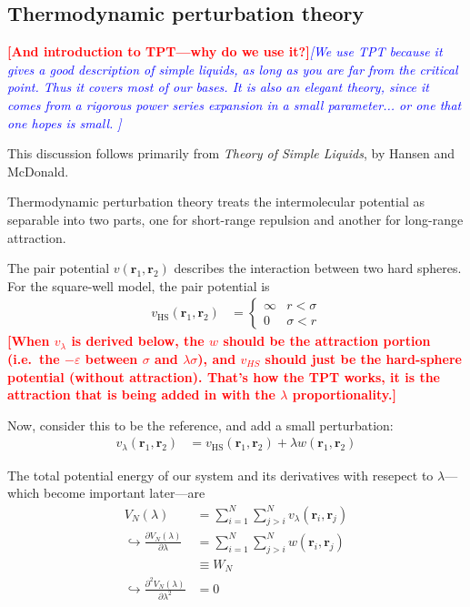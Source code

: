 \documentclass[letterpaper,twocolumn,amsmath,amssymb,prb]{revtex4-1}
\newcommand{\1}{\ensuremath{\textbf{r}_1}}
\newcommand{\2}{\ensuremath{\textbf{r}_2}}
\newcommand{\3}{\ensuremath{\textbf{r}_3}}
\newcommand{\4}{\ensuremath{\textbf{r}_4}}
\newcommand{\fixme}[1]{\textcolor{red}{\textbf{[#1]}}}
\newcommand{\davidsays}[1]{\textcolor{blue}{\textit{[#1]}}}
\begin{document}
\subsection{Thermodynamic perturbation theory}\label{subsec:TPT}

\fixme{And introduction to TPT---why do we use it?}\davidsays{We use
  TPT because it gives a good description of simple liquids, as long
  as you are far from the critical point.  Thus it covers most of our
  bases.  It is also an elegant theory, since it comes from a rigorous
  power series expansion in a small parameter... or one that one hopes
  is small. }

This discussion follows primarily from \textit{Theory of Simple
  Liquids}, by Hansen and McDonald\cite{Hansen06}.

Thermodynamic perturbation theory treats the intermolecular potential
as separable into two parts, one for short-range repulsion and another
for long-range attraction.

The pair potential $v(\1,\2)$ describes the interaction between two
hard spheres. For the square-well model, the pair potential is
\begin{align}
  v_\text{HS}(\1,\2) &=
    \begin{cases}
      \infty & r < \sigma \\
      0 & \sigma < r
    \end{cases}
\end{align}
\fixme{When $v_\lambda$ is derived below, the $w$
should be the attraction portion (i.e.~the $-\varepsilon$ between $\sigma$ and $\lambda\sigma$), and $v_{HS}$ should
just be the hard-sphere potential (without attraction).  That's how
the TPT works, it is the attraction that is being added in with the
$\lambda$ proportionality.}

Now, consider this to be the reference, and add a small perturbation:
\begin{align}
  v_\lambda(\1,\2) &= v_\text{HS}(\1,\2) + \lambda w(\1,\2) \label{eqn:small-perturbation}
\end{align}

The total potential energy of our system and its derivatives with resepect to $\lambda$---which become important later---are
\begin{align}
  V_N(\lambda) &= \sum_{i=1}^N\sum_{j>i}^N v_\lambda(\mathbf{r}_i,\mathbf{r}_j) \\ %
  \hookrightarrow \frac{\partial V_N(\lambda)}{\partial\lambda} &= \sum_{i=1}^N\sum_{j>i}^N w(\mathbf{r}_i,\mathbf{r}_j) \nonumber \\
  &\equiv W_N \\
  \hookrightarrow \frac{\partial^2 V_N(\lambda)}{\partial\lambda^2} &= 0
\end{align}
\end{document}

